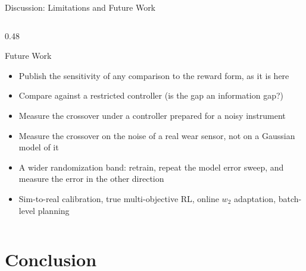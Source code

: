\documentclass[11pt,aspectratio=169]{beamer}
\begin{document}
\begin{frame}{Discussion: Limitations and Future Work}
\begin{columns}[T]
\begin{column}{0.48\textwidth}
\begin{exampleblock}{Future Work}
\begin{itemize}
                \item Publish the sensitivity of any comparison to the reward form, as it is here
                \item Compare against a restricted controller (is the gap an information gap?)
                \item Measure the crossover under a controller prepared for a noisy instrument
                \item Measure the crossover on the noise of a real wear sensor, not on a Gaussian model of it
                \item A wider randomization band: retrain, repeat the model error sweep, and measure the error in the other direction
                \item Sim-to-real calibration, true multi-objective RL, online $w_2$ adaptation, batch-level planning
            \end{itemize}
            \end{exampleblock}
        \end{column}
    \end{columns}
\end{frame}

\section{Conclusion}
\end{document}
